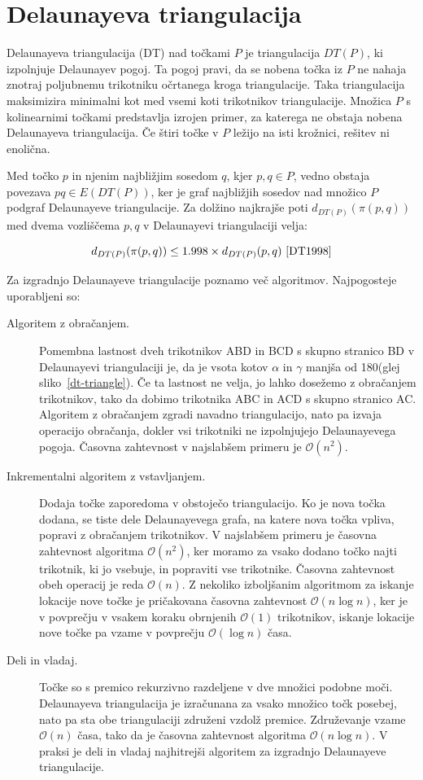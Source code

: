 \documentclass[a4paper, 12pt]{book}
\newcommand{\OO}{\ensuremath{\mathcal{O}}} %
\begin{document}
\section{Delaunayeva triangulacija}
Delaunayeva triangulacija (DT) nad točkami $P$ je triangulacija $DT(P)$, ki izpolnjuje Delaunayev pogoj. Ta pogoj pravi, da se nobena točka iz $P$ ne nahaja znotraj poljubnemu trikotniku očrtanega kroga triangulacije. Taka triangulacija
maksimizira minimalni kot med vsemi koti trikotnikov triangulacije. Množica $P$ s kolinearnimi točkami predstavlja izrojen primer, za katerega ne obstaja nobena Delaunayeva triangulacija. Če štiri točke v $P$ ležijo na isti krožnici, rešitev ni enolična.

Med točko $p$ in njenim najbližjim sosedom $q$, kjer $p,q\in P$, vedno obstaja povezava $pq\in E(DT(P))$, ker je graf najbližjih sosedov nad množico $P$ podgraf Delaunayeve triangulacije. Za dolžino najkrajše poti $d_{DT(P)}(\pi (p,q))$ med dvema 
vozliščema $p,q$ v Delaunayevi triangulaciji velja:

\begin{equation*}
d_{DT(P)}(\pi (p,q)) \le 1.998\times d_{DT(P)}(p,q)~\cite{DT1998}
\end{equation*}

Za izgradnjo Delaunayeve triangulacije poznamo več algoritmov. Najpogosteje uporabljeni so: 

\begin{description}
\item[Algoritem z obračanjem.] Pomembna lastnost dveh trikotnikov ABD in BCD s skupno stranico BD v Delaunayevi triangulaciji je, da je vsota kotov $\alpha$ in $\gamma$ manjša od 180\textdegree (glej sliko~\ref{dt-triangle}). Če ta lastnost ne velja, jo lahko dosežemo z obračanjem trikotnikov, tako da dobimo trikotnika ABC in ACD s skupno stranico AC. Algoritem z obračanjem zgradi navadno triangulacijo, nato pa izvaja operacijo obračanja, dokler vsi trikotniki ne izpolnjujejo Delaunayevega pogoja. Časovna zahtevnost v najslabšem primeru je $\OO(n^2)$.
\item[Inkrementalni algoritem z vstavljanjem.] Dodaja točke zaporedoma v obstoječo triangulacijo. Ko je nova točka dodana, se tiste dele Delaunayevega grafa, na katere nova točka vpliva, popravi z obračanjem trikotnikov. V najslabšem primeru je časovna zahtevnost algoritma $\OO(n^2)$, ker moramo za vsako dodano točko najti trikotnik, ki jo vsebuje, in popraviti vse trikotnike. Časovna zahtevnost obeh operacij je reda $\OO(n)$. Z nekoliko izboljšanim algoritmom za iskanje lokacije nove točke je pričakovana časovna zahtevnost $\OO(n\log n)$, ker je v povprečju v vsakem koraku obrnjenih $\OO(1)$ trikotnikov, iskanje lokacije nove točke pa vzame v povprečju $\OO(\log n)$ časa.
\item[Deli in vladaj.] Točke so s premico rekurzivno razdeljene v dve množici podobne moči. Delaunayeva triangulacija je izračunana za vsako množico točk posebej, nato pa sta obe triangulaciji združeni vzdolž premice. Združevanje vzame $\OO(n)$ časa, tako da je časovna zahtevnost algoritma $\OO(n\log n)$. V praksi je deli in vladaj najhitrejši algoritem za izgradnjo Delaunayeve triangulacije.
\end{description}
\end{document}
